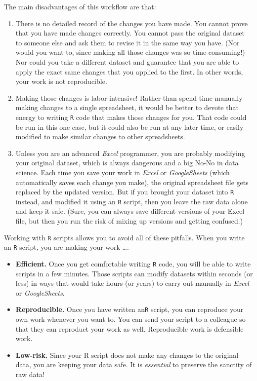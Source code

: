 \documentclass[
]{book}
\begin{document}
The main disadvantages of this workflow are that:

\begin{enumerate}
\def\labelenumi{\arabic{enumi}.}
\item
  There is no detailed record of the changes you have made. You cannot prove that you have made changes correctly. You cannot pass the original dataset to someone else and ask them to revise it in the same way you have. (Nor would you want to, since making all those changes was so time-consuming!) Nor could you take a different dataset and guarantee that you are able to apply the exact same changes that you applied to the first. In other words, your work is not reproducible.
\item
  Making those changes is labor-intensive! Rather than spend time manually making changes to a single spreadsheet, it would be better to devote that energy to writing \texttt{R} code that makes those changes for you. That code could be run in this one case, but it could also be run at any later time, or easily modified to make similar changes to other spreadsheets.
\item
  Unless you are an advanced \emph{Excel} programmer, you are probably modifying your original dataset, which is always dangerous and a big No-No in data science. Each time you save your work in \emph{Excel} or \emph{GoogleSheets} (which automatically saves each change you make), the original spreadsheet file gets replaced by the updated version. But if you brought your dataset into \texttt{R} instead, and modified it using an \texttt{R} script, then you leave the raw data alone and keep it safe. (Sure, you can always save different versions of your Excel file, but then you run the risk of mixing up versions and getting confused.)
\end{enumerate}

Working with \texttt{R} scripts allows you to avoid all of these pitfalls. When you write an \texttt{R} script, you are making your work \ldots.

\begin{itemize}
\item
  \textbf{Efficient.} Once you get comfortable writing \texttt{R} code, you will be able to write scripts in a few minutes. Those scripts can modify datasets within seconds (or less) in ways that would take hours (or years) to carry out manually in \emph{Excel} or \emph{GoogleSheets}.
\item
  \textbf{Reproducible.} Once you have written an\texttt{R} script, you can reproduce your own work whenever you want to. You can send your script to a colleague so that they can reproduct your work as well. Reproducible work is defensible work.
\item
  \textbf{Low-risk.} Since your R script does not make any changes to the original data, you are keeping your data safe. It is \emph{essential} to preserve the sanctity of raw data!
\end{itemize}
\end{document}
